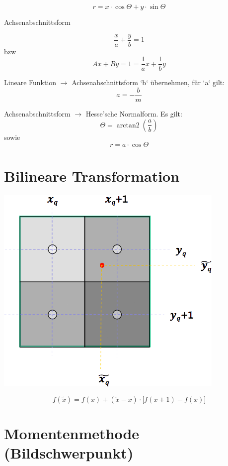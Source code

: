 \[ r = x \cdot \cos \Theta + y \cdot \sin \Theta \]



Achsenabschnittsform

\[ \frac{x}{a} + \frac{y}{b} = 1 \] bzw
\[ Ax + By = 1 = \frac{1}{a}x + \frac{1}{b}y \]


Lineare Funktion $\rightarrow$ Achsenabschnittsform
`b` übernehmen, für `a` gilt:
\[ a = -\frac{b}{m} \]



Achsenabschnittsform $\rightarrow$ Hesse'sche Normalform. Es gilt:
\[ \Theta = \operatorname{arctan2} \left ( \frac{a}{b} \right ) \]
sowie
\[ r = a \cdot \cos \Theta \]






\section{Bilineare Transformation}

\includegraphics[width=\linewidth]{images/bilinearTransformation.png}


\[
	f(\tilde{x}) = f(x) + (\tilde{x}-x) \cdot \bigg [ f(x+1)-f(x) \bigg ]
\]








\columnbreak
\section{Momentenmethode (Bildschwerpunkt)}

